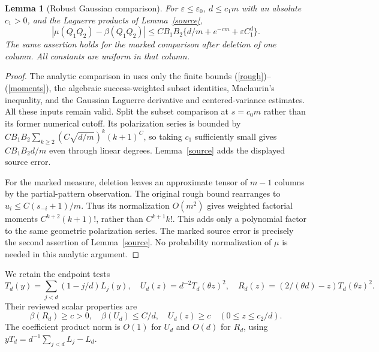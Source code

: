 \documentclass[11pt]{article}
\newtheorem{lemma}{Lemma}
\begin{document}
\begin{lemma}[Robust Gaussian comparison]\label{comparison}
For $\varepsilon\le\varepsilon_0$, $d\le c_1m$ with an absolute
$c_1>0$, and the Laguerre products of Lemma~\ref{source},
\[
 |\mu(Q_1Q_2)-\beta(Q_1Q_2)|
 \le C B_1B_2\{d/m+e^{-cm}+\varepsilon C_1^d\}.   \tag{4}
\]
The same assertion holds for the marked comparison after deletion of
one column. All constants are uniform in that column.
\end{lemma}
\begin{proof}
The analytic comparison in 
uses only the finite bounds (\ref{rough})--(\ref{moments}), the
algebraic success-weighted subset identities, Maclaurin's inequality,
and the Gaussian Laguerre derivative and centered-variance estimates.
All these inputs remain valid. Split the subset comparison at
$s=c_0m$ rather than its former numerical cutoff. Its polarization
series is bounded by
$CB_1B_2\sum_{k\ge2}(C\sqrt{d/m})^k(k+1)^C$, so taking $c_1$
sufficiently small gives $CB_1B_2d/m$ even through linear degrees.
Lemma~\ref{source} adds the displayed source error.

For the marked measure, deletion leaves an approximate tensor of
$m-1$ columns by the partial-pattern observation. The original rough
bound rearranges to $u_i\le C(s_{-i}+1)/m$. Thus its normalization
$O(m^2)$ gives weighted factorial moments $C^{k+2}(k+1)!$, rather
than $C^{k+1}k!$. This adds only a polynomial factor to the same
geometric polarization series. The marked source error is precisely
the second assertion of Lemma~\ref{source}. No probability
normalization of $\mu$ is needed in this analytic argument.
\end{proof}

We retain the endpoint tests
\[
 T_d(y)=\sum_{j<d}(1-j/d)L_j(y),\quad
 U_d(z)=d^{-2}T_d(\theta z)^2,\quad
 R_d(z)=(2/(\theta d)-z)T_d(\theta z)^2.
\]
Their reviewed scalar properties are
\[
 \beta(R_d)\ge c>0,\quad \beta(U_d)\le C/d,
 \quad U_d(z)\ge c\quad(0\le z\le c_2/d).
 \tag{5}
\]
The coefficient product norm is $O(1)$ for $U_d$ and $O(d)$ for
$R_d$, using $yT_d=d^{-1}\sum_{j<d}L_j-L_d$.
\end{document}
